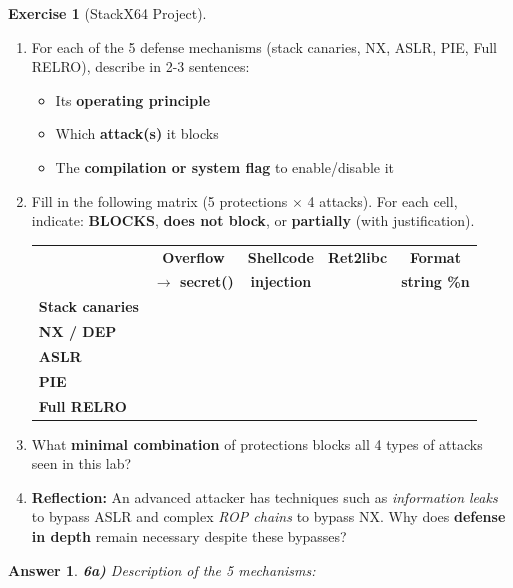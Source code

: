 \documentclass[a4paper,11pt]{article}
\theoremstyle{plain}
\newtheorem{correction}{Answer}
\theoremstyle{definition}
\newtheorem{exercice}{Exercise}
\begin{document}
\begin{exercice}[StackX64 Project]
\begin{enumerate}
\item[\textbf{6a)}] For each of the 5 defense mechanisms (stack canaries, NX, ASLR, PIE, Full RELRO), describe in 2-3 sentences:
\begin{itemize}
    \item Its \textbf{operating principle}
    \item Which \textbf{attack(s)} it blocks
    \item The \textbf{compilation or system flag} to enable/disable it
\end{itemize}

\item[\textbf{6b)}] Fill in the following matrix (5 protections $\times$ 4 attacks). For each cell, indicate: \textbf{BLOCKS}, \textbf{does not block}, or \textbf{partially} (with justification).

\begin{center}
\begin{tabular}{l|c|c|c|c}
\toprule
& \textbf{Overflow} & \textbf{Shellcode} & \textbf{Ret2libc} & \textbf{Format} \\
& \textbf{$\to$ secret()} & \textbf{injection} & & \textbf{string \%n} \\
\midrule
\textbf{Stack canaries} & & & & \\
\midrule
\textbf{NX / DEP} & & & & \\
\midrule
\textbf{ASLR} & & & & \\
\midrule
\textbf{PIE} & & & & \\
\midrule
\textbf{Full RELRO} & & & & \\
\bottomrule
\end{tabular}
\end{center}

\item[\textbf{6c)}] What \textbf{minimal combination} of protections blocks all 4 types of attacks seen in this lab?

\item[\textbf{6d)}] \textbf{Reflection:} An advanced attacker has techniques such as \textit{information leaks} to bypass ASLR and complex \textit{ROP chains} to bypass NX. Why does \textbf{defense in depth} remain necessary despite these bypasses?
\end{enumerate}

\begin{correction}

\textbf{6a)} Description of the 5 mechanisms:


\end{correction}
\end{exercice}
\end{document}
